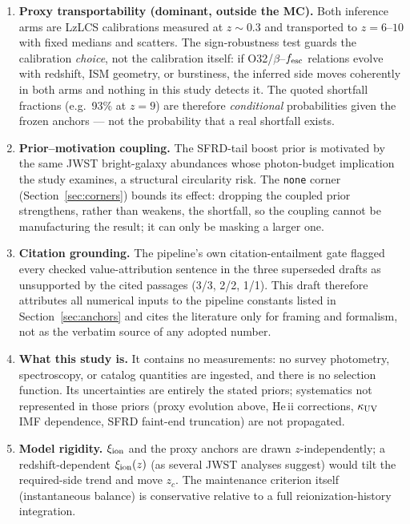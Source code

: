 \documentclass[twocolumn]{aastex702}
\begin{document}
\begin{enumerate}
\item \textbf{Proxy transportability (dominant, outside the MC).} Both inference arms are LzLCS calibrations measured at $z\sim0.3$ and transported to $z=6$--$10$ with fixed medians and scatters. The sign-robustness test guards the calibration \emph{choice}, not the calibration itself: if O32/$\beta$--$f_{\rm esc}$ relations evolve with redshift, ISM geometry, or burstiness, the inferred side moves coherently in both arms and nothing in this study detects it. The quoted shortfall fractions (e.g.\ 93\% at $z=9$) are therefore \emph{conditional} probabilities given the frozen anchors --- not the probability that a real shortfall exists.
\item \textbf{Prior--motivation coupling.} The SFRD-tail boost prior is motivated by the same JWST bright-galaxy abundances whose photon-budget implication the study examines, a structural circularity risk. The \texttt{none} corner (Section~\ref{sec:corners}) bounds its effect: dropping the coupled prior strengthens, rather than weakens, the shortfall, so the coupling cannot be manufacturing the result; it can only be masking a larger one.
\item \textbf{Citation grounding.} The pipeline's own citation-entailment gate flagged every checked value-attribution sentence in the three superseded drafts as unsupported by the cited passages (3/3, 2/2, 1/1). This draft therefore attributes all numerical inputs to the pipeline constants listed in Section~\ref{sec:anchors} and cites the literature only for framing and formalism, not as the verbatim source of any adopted number.
\item \textbf{What this study is.} It contains no measurements: no survey photometry, spectroscopy, or catalog quantities are ingested, and there is no selection function. Its uncertainties are entirely the stated priors; systematics not represented in those priors (proxy evolution above, He\,{\sc ii} corrections, $\kappa_{\rm UV}$ IMF dependence, SFRD faint-end truncation) are not propagated.
\item \textbf{Model rigidity.} $\xi_{\rm ion}$ and the proxy anchors are drawn $z$-independently; a redshift-dependent $\xi_{\rm ion}(z)$ (as several JWST analyses suggest) would tilt the required-side trend and move $z_c$. The maintenance criterion itself (instantaneous balance) is conservative relative to a full reionization-history integration.
\end{enumerate}
\end{document}
